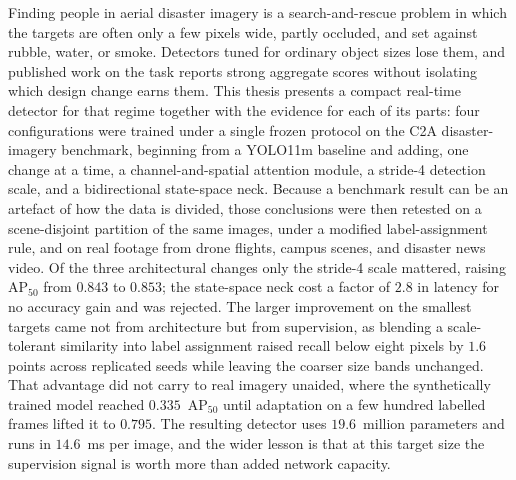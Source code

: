 
Finding people in aerial disaster imagery is a search-and-rescue problem in
which the targets are often only a few pixels wide, partly occluded, and set
against rubble, water, or smoke. Detectors tuned for ordinary object sizes lose
them, and published work on the task reports strong aggregate scores without
isolating which design change earns them. This thesis presents a compact
real-time detector for that regime together with the evidence for each of its
parts: four configurations were trained under a single frozen protocol on the
C2A disaster-imagery benchmark, beginning from a YOLO11m baseline and adding,
one change at a time, a channel-and-spatial attention module, a stride-4
detection scale, and a bidirectional state-space neck. Because a benchmark
result can be an artefact of how the data is divided, those conclusions were
then retested on a scene-disjoint partition of the same images, under a
modified label-assignment rule, and on real footage from drone flights, campus
scenes, and disaster news video. Of the three architectural changes only the
stride-4 scale mattered, raising $\mathrm{AP}_{50}$ from $0.843$ to $0.853$;
the state-space neck cost a factor of $2.8$ in latency for no accuracy gain and
was rejected. The larger improvement on the smallest targets came not from
architecture but from supervision, as blending a scale-tolerant similarity into
label assignment raised recall below eight pixels by $1.6$ points across
replicated seeds while leaving the coarser size bands unchanged. That advantage
did not carry to real imagery unaided, where the synthetically trained model
reached $0.335$~$\mathrm{AP}_{50}$ until adaptation on a few hundred labelled
frames lifted it to $0.795$. The resulting detector uses $19.6$~million
parameters and runs in $14.6$~ms per image, and the wider lesson is that at
this target size the supervision signal is worth more than added network
capacity.
\clearpage
